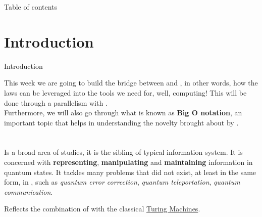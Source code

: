 \documentclass[aspectratio=43]{beamer}
\title{\qis}
\date{November, 2018}
\author[Ramalho]{Miguel Sozinho Ramalho}
\begin{document}
\begin{frame}
	\titlepage
\end{frame}


\begin{frame}{Table of contents}
	\begin{card}
		\tableofcontents
	\end{card}
\end{frame}


\section{Introduction}
\begin{frame}{Introduction}
    \begin{card}
    This week we are going to build the bridge between \textbf{\qm} and \textbf{\qc}, in other words, how the \q laws can be leveraged into the tools we need for, well, computing! This will be done through a parallelism with \cc. \\
    Furthermore, we will also go through what is known as \textbf{Big O notation}, an important topic that helps in understanding the novelty brought about by \qc.
    \end{card}
\pagenumber
\end{frame}

\section{\qis}
\begin{frame}{\qis}
    \begin{card}
    Is a broad area of studies, it is the \q sibling of typical information system. It is concerned with \textbf{representing}, \textbf{manipulating} and \textbf{maintaining} information in quantum states. It tackles many problems that did not exist, at least in the same form, in \cc, such as \textit{quantum error correction}, \textit{quantum teleportation}, \textit{quantum communication}.
    \end{card}
    \begin{card}
    Reflects the combination of \qm with the classical \href{http://mathworld.wolfram.com/TuringMachine.html}{Turing Machines}.
    \end{card}
\pagenumber
\end{frame}
\end{document}
